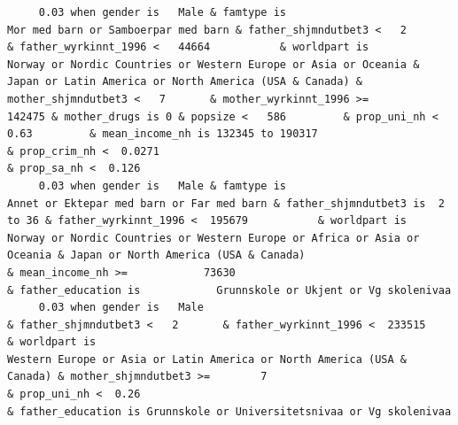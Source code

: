 \documentclass[
  letterpaper,
  DIV=11,
  numbers=noendperiod]{scrreprt}
\begin{document}
\begin{verbatim}
     0.03 when gender is   Male & famtype is                              Mor med barn or Samboerpar med barn & father_shjmndutbet3 <   2       & father_wyrkinnt_1996 <   44664           & worldpart is            Norway or Nordic Countries or Western Europe or Asia or Oceania & Japan or Latin America or North America (USA & Canada) & mother_shjmndutbet3 <   7       & mother_wyrkinnt_1996 >=           142475 & mother_drugs is 0 & popsize <   586         & prop_uni_nh <  0.63         & mean_income_nh is 132345 to 190317                              & prop_crim_nh <  0.0271                                                                                                                  & prop_sa_nh <  0.126                                                                                                                                               
     0.03 when gender is   Male & famtype is                        Annet or Ektepar med barn or Far med barn & father_shjmndutbet3 is  2 to 36 & father_wyrkinnt_1996 <  195679           & worldpart is                   Norway or Nordic Countries or Western Europe or Africa or Asia or Oceania & Japan or North America (USA & Canada)                                                                                                                                                          & mean_income_nh >=            73630                                                                                                                                                                                                                                                  & father_education is            Grunnskole or Ukjent or Vg skolenivaa                    
     0.03 when gender is   Male                                                                               & father_shjmndutbet3 <   2       & father_wyrkinnt_1996 <  233515           & worldpart is                                                             Western Europe or Asia or Latin America or North America (USA & Canada) & mother_shjmndutbet3 >=        7                                                                                          & prop_uni_nh <  0.26                                                                                                                                                                                                                                                                                               & father_education is Grunnskole or Universitetsnivaa or Vg skolenivaa                    

\end{verbatim}
\end{document}
